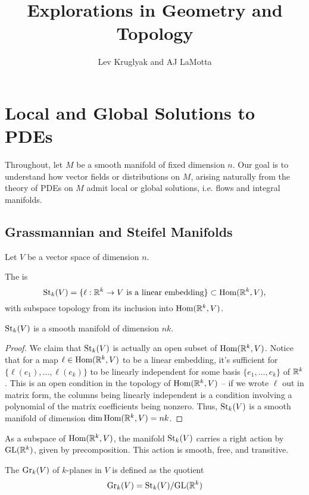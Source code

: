 \documentclass{lkx_paper}
\title{\textbf{Explorations in Geometry and Topology}}
\date{}
\author{Lev Kruglyak and AJ LaMotta}
\begin{document}
\maketitle

\section{Local and Global Solutions to PDEs}

Throughout, let $M$ be a smooth manifold of fixed dimension $n$.
Our goal is to understand how vector fields or distributions on $M$, arising naturally from the theory of PDEs on $M$ admit local or global solutions, i.e. flows and integral manifolds.

\subsection{Grassmannian and Steifel Manifolds}

Let $V$ be a vector space of dimension $n$.

\begin{definition}
	The  is
	\[
		\mathrm{St}_k(V) = \{ \ell : \mathbb{R}^k \to V \textrm{ is a linear embedding}\} \subset \textrm{Hom}(\mathbb{R}^k, V),
	\]
	with subspace topology from its inclusion into $\textrm{Hom}(\mathbb{R}^k, V)$.
\end{definition}

\begin{proposition}
	$\mathrm{St}_k(V)$ is a smooth manifold of dimension $nk$.
\end{proposition}
\begin{proof}
	We claim that $\mathrm{St}_k(V)$ is actually an open subset of $\textrm{Hom}(\mathbb{R}^k, V)$. Notice that for a map $\ell\in \textrm{Hom}(\mathbb{R}^k, V)$ to be a linear embedding, it's sufficient for $\{\ell(e_1), \ldots, \ell(e_k)\}$ to be linearly independent for some basis $\{e_1,\ldots, e_k\}$ of $\mathbb{R}^k$. This is an open condition in the topology of $\textrm{Hom}(\mathbb{R}^k, V)$ -- if we wrote $\ell$ out in matrix form, the columns being linearly independent is a condition involving a polynomial of the matrix coefficients being nonzero. Thus, $\mathrm{St}_k(V)$ is a smooth manifold of dimension $\dim\textrm{Hom}(\mathbb{R}^k, V) = nk$.
\end{proof}

As a subspace of $\textrm{Hom}(\mathbb{R}^k, V)$, the manifold $\mathrm{St}_k(V)$ carries a right action by $\mathrm{GL}(\mathbb{R}^k)$, given by precomposition. This action is smooth, free, and transitive.

\begin{definition}
	The  $\mathrm{Gr}_k(V)$ of $k$-planes in $V$ is defined as the quotient
	\[
		\mathrm{Gr}_k(V) = \mathrm{St}_k(V) / \mathrm{GL}(\mathbb{R}^k)
	\]
\end{definition}
\end{document}
